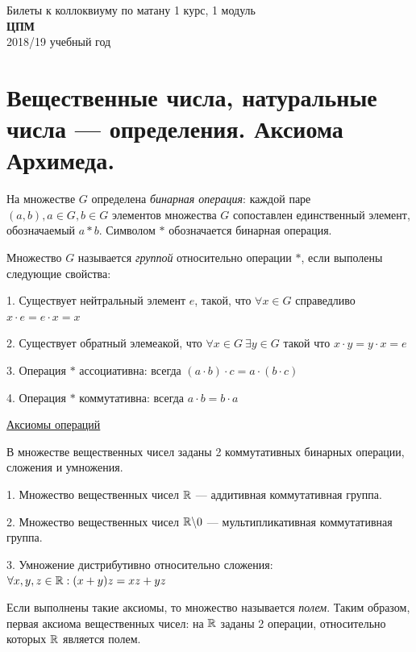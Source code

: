 

\begin{center}
{\Large Билеты к коллоквиуму по матану 1 курс, 1 модуль}\\
\textbf{ЦПМ}\\ %
2018/19 учебный год %
\end{center}


\section{Вещественные числа, натуральные числа — определения. Аксиома Архимеда.}

На множестве $G$ определена \textit{бинарная операция}: каждой паре $(a,b), a \in G,b \in G$ элементов множества $G$ сопоставлен единственный элемент, обозначаемый $a*b$. Символом $*$ обозначается бинарная операция.

Множество $G$ называется \textit{группой} относительно операции $*$, если выполены следующие свойства:

    1.	Существует нейтральный элемент $e$, такой, что $\forall x \in G$ справедливо $x\cdot e = e\cdot x = x$
    
    2.	Существует обратный элемеакой, что $\forall x \in G \:  \exists y \in G$ такой что $x\cdot y = y\cdot x = e$
    
    3.	Операция $*$ ассоциативна: всегда $(a\cdot b)\cdot c =  a\cdot(b\cdot c)$
    
    4.	Операция $*$ коммутативна: всегда $a\cdot b = b\cdot a$

\underline{Аксиомы операций}

В множестве вещественных чисел заданы 2 коммутативных бинарных операции, сложения
и умножения.

1. Множество вещественных чисел $\mathbb{R} $ — аддитивная коммутативная группа.

2. Множество вещественных чисел $ \mathbb{R} \backslash  {0}$ — мультипликативная коммутативная группа.

3. Умножение дистрибутивно относительно сложения:$\forall x,y,z \in \mathbb{R}: (x+y)z = xz + yz$

Если выполнены такие аксиомы, то множество называется \textit{полем}.
Таким образом, первая аксиома вещественных чисел: на $\mathbb{R}$ заданы 2 операции, относительно
которых $\mathbb{R}$  является полем.

